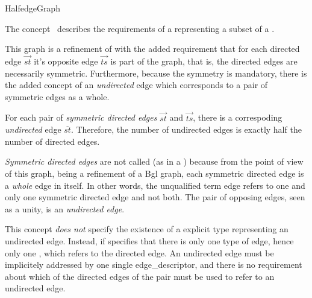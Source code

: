 
\begin{ccRefConcept}{HalfedgeGraph}


\ccDefinition

The concept \ccRefName\ describes the requirements of a
representing a subset of a .

This graph is a refinement of  with the
added requirement that for each directed edge $\overrightarrow{st}$
it's opposite edge $\overrightarrow{ts}$ is part of the graph, that is, the
directed edges are necessarily symmetric. Furthermore, because the
symmetry is mandatory, there is the added concept of an {\em
undirected} edge which corresponds to a pair of symmetric edges as a
whole.

For each pair of {\em symmetric directed edges} $\overrightarrow{st}$
and $\overrightarrow{ts}$, there is a correspoding {\em undirected}
edge $\overline{st}$. Therefore, the number of undirected edges is
exactly half the number of directed edges.

{\em Symmetric directed edges} are not called  (as in a
) because from the point of view of this graph, being
a refinement of a {\sc Bgl} graph, each symmetric directed edge is a {\em
whole} edge in itself. In other words, the unqualified term edge
refers to one and only one symmetric directed edge and not both. The
pair of opposing edges, seen as a unity, is an {\em undirected edge}.
 
This concept {\em does not} specify the existence of a explicit type representing 
an undirected edge. Instead, if specifies that there is only one type of edge,
hence only one , which refers to the directed edge.
An undirected edge must be implicitely addressed by one single edge\_descriptor,
and there is no requirement about which of the directed edges of the pair must
be used to refer to an undirected edge.


\end{ccRefConcept}
